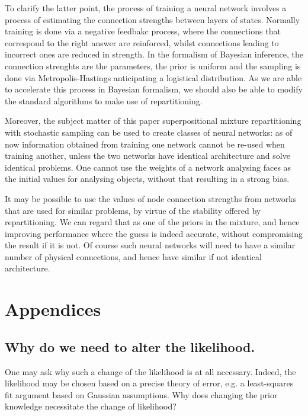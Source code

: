 \documentclass[usenatbib]{mnras}
\begin{document}
To clarify the latter point, the process of training a neural
network involves a process of estimating the connection strengths
between layers of states. Normally training is done via a negative
feedbakc process, where the connections that correspond to the
right answer are reinforced, whilst connections leading to
incorrect ones are reduced in strength. In the formalism of
Bayesian inference, the connection strenghts are the parameters,
the prior is uniform and the sampling is done via
Metropolis-Hastings anticipating a logistical distribution. As we
are able to accelerate this process in Bayesian formalism, we
should also be able to modify the standard algorithms to make use
of repartitioning.

Moreover, the subject matter of this paper superpositional mixture
repartitioning with stochastic sampling can be used to create
classes of neural networks: as of now information obtained from
training one network cannot be re-used when training another,
unless the two networks have identical architecture and solve
identical problems. One cannot use the weights of a network
analysing faces as the initial values for analysing objects,
without that resulting in a strong bias. 

It may be possible to use the values of node connection strengths
from networks that are used for similar problems, by virtue of the
stability offered by repartitioning. We can regard that as one of
the priors in the mixture, and hence improving performance where
the guess is indeed accurate, without compromising the result if it
is not. Of course such neural networks will need to have a similar
number of physical connections, and hence have similar if not
identical architecture.

 


\section{Appendices}
\label{sec:org30d8038}

\subsection{Why do we need to alter the likelihood.}
\label{sec:orgd1c01e8}
One may ask why such a change of the likelihood is at all
necessary. Indeed, the likelihood may be chosen based on a precise
theory of error, e.g. a least-squares fit argument based on
Gaussian assumptions. Why does changing the prior knowledge
necessitate the change of likelihood?
\end{document}
